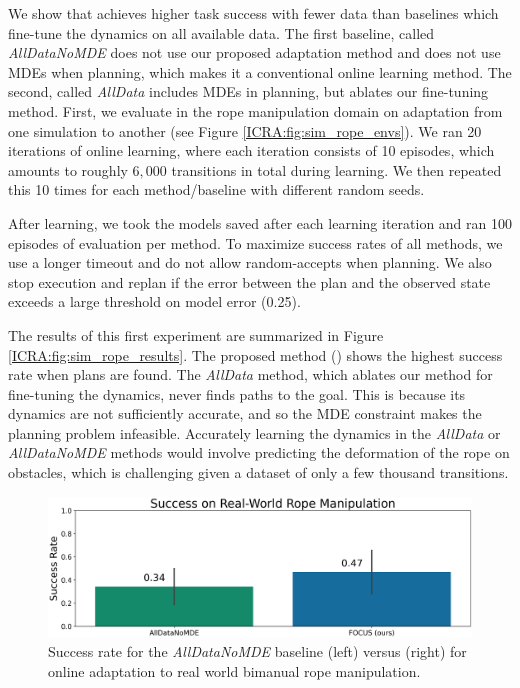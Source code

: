 We show that \FOCUS{} achieves higher task success with fewer data than baselines which fine-tune the dynamics on all available data. The first baseline, called \textit{AllDataNoMDE} does not use our proposed adaptation method and does not use MDEs when planning, which makes it a conventional online learning method. The second, called \textit{AllData} includes MDEs in planning, but ablates our fine-tuning method. First, we evaluate in the rope manipulation domain on adaptation from one simulation to another (see Figure \ref{ICRA:fig:sim_rope_envs}). We ran 20 iterations of online learning, where each iteration consists of 10 episodes, which amounts to roughly $6,000$ transitions in total during learning. We then repeated this 10 times for each method/baseline with different random seeds.

After learning, we took the models saved after each learning iteration and ran 100 episodes of evaluation per method. To maximize success rates of all methods, we use a longer timeout and do not allow random-accepts when planning. We also stop execution and replan if the error between the plan and the observed state exceeds a large threshold on model error (0.25).

The results of this first experiment are summarized in Figure \ref{ICRA:fig:sim_rope_results}. The proposed method (\FOCUS{}) shows the highest success rate when plans are found. The \textit{AllData} method, which ablates our method for fine-tuning the dynamics, never finds paths to the goal. This is because its dynamics are not sufficiently accurate, and so the MDE constraint makes the planning problem infeasible. Accurately learning the dynamics in the \textit{AllData} or \textit{AllDataNoMDE} methods would involve predicting the deformation of the rope on obstacles, which is challenging given a dataset of only a few thousand transitions.

\begin{figure}
    \centering
    \includegraphics[width=0.7\linewidth]{Chap4/images/real_success.png}
    \caption{Success rate for the \textit{AllDataNoMDE} baseline (left) versus \FOCUS{} (right) for online adaptation to real world bimanual rope manipulation.}
    \label{ICRA:fig:real_rope_success}
\end{figure}

